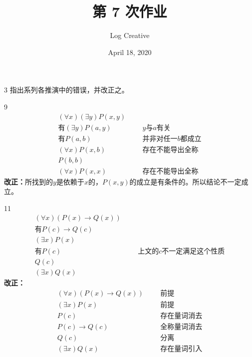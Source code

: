 \documentclass[12pt]{article}
\title{第 7 次作业}
\author{Log Creative}
\date{April 18, 2020}
\newenvironment{firstlayer}%
{\begin{list}{}{\renewcommand{\makelabel}[1]{\textbf{##1}.\hfil}
}}
{\end{list}}
\newenvironment{secondlayer}%
{\begin{list}{}{\renewcommand{\makelabel}[1]{(##1)\hfil}
}}
{\end{list}}
\begin{document}
\begin{CJK}{UTF8}{gbsn}

\maketitle

\begin{firstlayer}
  \item[3]指出系列各推演中的错误，并改正之。
  \begin{secondlayer}
    \item[9]
    \begin{align*}
      (\forall x)(\exists y)P(x,y) & && \\
      \text{有}(\exists y)P(a,y) & &&\text{$y$与$a$有关} \\
      \text{有}P(a,b) & &&\text{并非对任一$b$都成立} \\
      (\forall x)P(x,b) & && \text{存在不能导出全称} \\
      P(b,b) & && \\
      (\forall x)P(x,x) & && \text{存在不能导出全称}
    \end{align*}
    \textbf{改正：}所找到的$y$是依赖于$x$的，$P(x,y)$的成立是有条件的。所以结论不一定成立。
    \item[11]
    \begin{align*}
     (\forall x)(P(x)\rightarrow Q(x)) & && \\
     \text{有}P(c)\rightarrow Q(c) & && \\
     (\exists x)P(x) & && \\
     \text{有}P(c) & &&\text{上文的$c$不一定满足这个性质} \\
     Q(c) & && \\
     (\exists x)Q(x) & &&
    \end{align*}
    \textbf{改正：}
    \begin{align*}
     (\forall x)(P(x)\rightarrow Q(x)) & && \text{前提}\\
     (\exists x)P(x) & && \text{前提} \\
     P(c) & && \text{存在量词消去} \\
     P(c)\rightarrow Q(c) & && \text{全称量词消去} \\
     Q(c) & && \text{分离} \\
     (\exists x)Q(x) & && \text{存在量词引入}
    \end{align*}
    
  \end{secondlayer}
\end{firstlayer}

\end{CJK}
\end{document}
